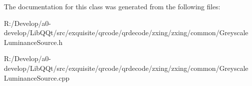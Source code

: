 The documentation for this class was generated from the following files\+:\begin{DoxyCompactItemize}
\item 
R\+:/\+Develop/a0-\/develop/\+Lib\+Q\+Qt/src/exquisite/qrcode/qrdecode/zxing/zxing/common/Greyscale\+Luminance\+Source.\+h\item 
R\+:/\+Develop/a0-\/develop/\+Lib\+Q\+Qt/src/exquisite/qrcode/qrdecode/zxing/zxing/common/Greyscale\+Luminance\+Source.\+cpp\end{DoxyCompactItemize}
